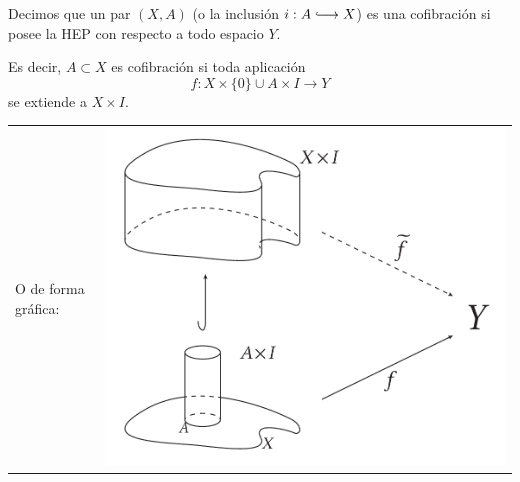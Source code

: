 \begin{defin}
Decimos que un par $(X,A)$ (o la inclusión $i: A \longhookrightarrow X$) es una cofibración si posee la HEP con respecto a todo espacio $Y$. \par 
Es decir, $A \subset X$ es cofibración si toda aplicación  
\[ f : X \times \{0\} \cup A \times I \longrightarrow Y \]
se extiende a $X \times I$. \par
\begin{tabular}{ll}
\begin{minipage}{0.5\textwidth}
O de forma gráfica: 
\end{minipage}
&
\begin{minipage}{0.5\textwidth}
\includegraphics[width=0.7\linewidth]{images/cofibrac}
\end{minipage}
\end{tabular}

\end{defin}

